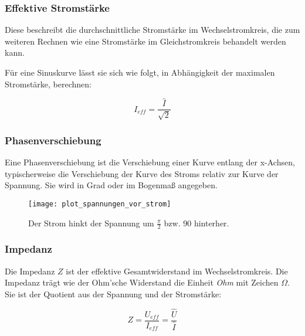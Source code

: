 \subsubsection{Effektive Stromstärke}

Diese beschreibt die durchschnittliche Stromstärke im Wechselstromkreis, die zum weiteren Rechnen wie eine Stromstärke im Gleichstromkreis behandelt werden kann.

Für eine Sinuskurve lässt sie sich wie folgt, in Abhängigkeit der maximalen Stromstärke, berechnen:

\begin{equation}	\label{eq:EffektiveStromstaerke}
	I_{eff}=\frac{\hat{I}}{\sqrt{2}}
\end{equation}


\subsubsection{Phasenverschiebung}

Eine Phasenverschiebung ist die Verschiebung einer Kurve entlang der x-Achsen, typischerweise die Verschiebung der Kurve des Stroms relativ zur Kurve der Spannung. Sie wird in Grad oder im Bogenmaß angegeben.


\begin{figure}[h!]
	\centering
	\begin{comment} Gnuplot: './xpitics.p'
set xlabel "t"
set ylabel "I, U"
set output "plot_spannungen_vor_strom.png"
plot cos(x)*0.7 title "Strom" ls 1, sin(x) title "Spannung" ls 3
	\end{comment}
	\texttt{[image: plot\_spannungen\_vor\_strom]}
	\caption{\glqq Der Strom hinkt der Spannung um $\frac{\pi}{2}$ bzw. 90\degree{} hinterher.\grqq }
\end{figure}



\subsubsection{Impedanz}

Die Impedanz $Z$ ist der effektive Gesamtwiderstand im Wechselstromkreis. Die Impedanz trägt wie der Ohm'sche Widerstand die Einheit \emph{Ohm} mit Zeichen $\Omega$. Sie ist der Quotient aus der Spannung und der Stromstärke:

\begin{equation}		\label{eq:Impedanz}
	Z = \frac{U_{eff}}{I_{eff}}
	  = \frac{\hat{U}}{\hat{I}}
\end{equation}


